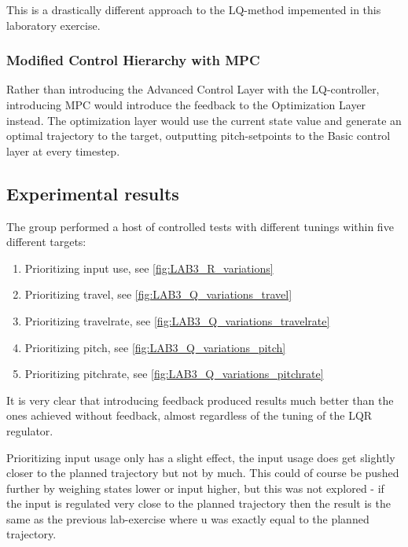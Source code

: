 \documentclass[../main.tex]{subfiles}
\begin{document}
This is a drastically different approach to the LQ-method impemented in this laboratory exercise.

\subsubsection{Modified Control Hierarchy with MPC}
Rather than introducing the Advanced Control Layer with the LQ-controller, introducing MPC would introduce the feedback to the Optimization Layer instead. The optimization layer would use the current state value and generate an optimal trajectory to the target, outputting pitch-setpoints to the Basic control layer at every timestep.


\subsection{Experimental results}\label{sec:lab3_result}
The group performed a host of controlled tests with different tunings within five different targets:
\begin{enumerate}
	\item Prioritizing input use, see \cref{fig:LAB3_R_variations}
	\item Prioritizing travel, see \cref{fig:LAB3_Q_variations_travel}
	\item Prioritizing travelrate, see \cref{fig:LAB3_Q_variations_travelrate}
	\item Prioritizing pitch, see \cref{fig:LAB3_Q_variations_pitch}
	\item Prioritizing pitchrate, see \cref{fig:LAB3_Q_variations_pitchrate}
\end{enumerate}

It is very clear that introducing feedback produced results much better than the ones achieved without feedback, almost regardless of the tuning of the LQR regulator.

Prioritizing input usage only has a slight effect, the input usage does get slightly closer to the planned trajectory but not by much. This could of course be pushed further by weighing states lower or input higher, but this was not explored - if the input is regulated very close to the planned trajectory then the result is the same as the previous lab-exercise where u was exactly equal to the planned trajectory.
\end{document}
